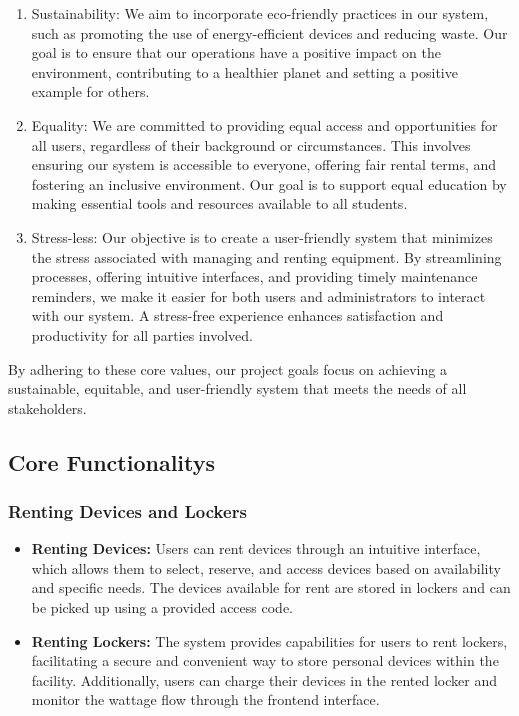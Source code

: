 \begin{enumerate}
\item Sustainability: We aim to incorporate eco-friendly practices in our system, such as promoting the use of energy-efficient devices and reducing waste. Our goal is to ensure that our operations have a positive impact on the environment, contributing to a healthier planet and setting a positive example for others.
\item Equality: We are committed to providing equal access and opportunities for all users, regardless of their background or circumstances. This involves ensuring our system is accessible to everyone, offering fair rental terms, and fostering an inclusive environment. Our goal is to support equal education by making essential tools and resources available to all students.

\item Stress-less: Our objective is to create a user-friendly system that minimizes the stress associated with managing and renting equipment. By streamlining processes, offering intuitive interfaces, and providing timely maintenance reminders, we make it easier for both users and administrators to interact with our system. A stress-free experience enhances satisfaction and productivity for all parties involved.
\end{enumerate}

By adhering to these core values, our project goals focus on achieving a sustainable, equitable, and user-friendly system that meets the needs of all stakeholders.

\subsection{Core Functionalitys}
\subsubsection{Renting Devices and Lockers}
\begin{itemize}
\item \textbf{Renting Devices:} Users can rent devices through an intuitive interface, which allows them to select, reserve, and access devices based on availability and specific needs. The devices available for rent are stored in lockers and can be picked up using a provided access code.
\item \textbf{Renting Lockers:}  The system provides capabilities for users to rent lockers, facilitating a secure and convenient way to store personal devices within the facility. Additionally, users can charge their devices in the rented locker and monitor the wattage flow through the frontend interface.
\end{itemize}

